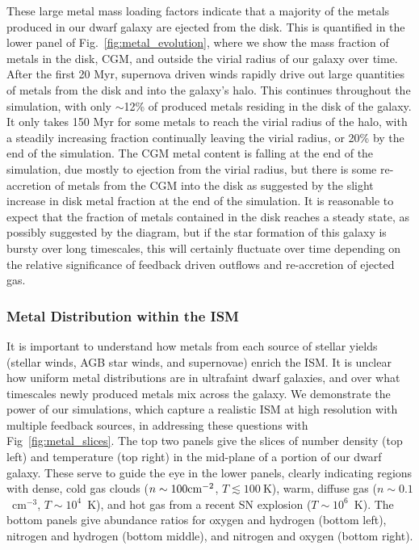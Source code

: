 \documentclass[twocolumn]{aastex61}
\begin{document}
These large metal mass loading factors indicate that a majority of the metals produced in our dwarf galaxy are ejected from the disk. This is quantified in the lower panel of Fig.~\ref{fig:metal_evolution}, where we show the mass fraction of metals in the disk, CGM, and outside the virial radius of our galaxy over time. After the first 20 Myr, supernova driven winds rapidly drive out large quantities of metals from the disk and into the galaxy's halo. This continues throughout the simulation, with only $\sim$12\% of produced metals residing in the disk of the galaxy. It only takes 150 Myr for some metals to reach the virial radius of the halo, with a steadily increasing fraction continually leaving the virial radius, or 20\% by the end of the simulation. The CGM metal content is falling at the end of the simulation, due mostly to ejection from the virial radius, but there is some re-accretion of metals from the CGM into the disk as suggested by the slight increase in disk metal fraction at the end of the simulation. It is reasonable to expect that the fraction of metals contained in the disk reaches a steady state, as possibly suggested by the diagram, but if the star formation of this galaxy is bursty over long timescales, this will certainly fluctuate over time depending on the relative significance of feedback driven outflows and re-accretion of ejected gas.

\subsubsection{Metal Distribution within the ISM}

It is important to understand how metals from each source of stellar yields (stellar winds, AGB star winds, and supernovae) enrich the ISM. It is unclear how uniform metal distributions are in ultrafaint dwarf galaxies, and over what timescales newly produced metals mix across the galaxy. We demonstrate the power of our simulations, which capture a realistic ISM at high resolution with multiple feedback sources, in addressing these questions with Fig~\ref{fig:metal_slices}. The top two panels give the slices of number density (top left) and temperature (top right) in the mid-plane of a portion of our dwarf galaxy. These serve to guide the eye in the lower panels, clearly indicating regions with dense, cold gas clouds ($n \sim 100 \rm{cm}^{-2}$, $T \lesssim 100~$K), warm, diffuse gas ($n\sim 0.1$~cm$^{-3}$, $T\sim 10^{4}$~K), and hot gas from a recent SN explosion ($T\sim10^{6}$~K). The bottom panels give abundance ratios for oxygen and hydrogen (bottom left), nitrogen and hydrogen (bottom middle), and nitrogen and oxygen (bottom right). 
\end{document}
